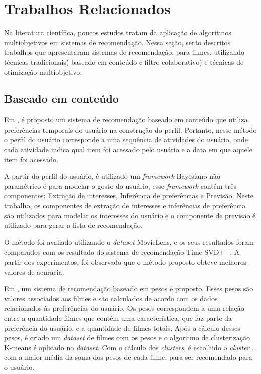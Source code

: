 \section{Trabalhos Relacionados}
Na literatura científica, poucos estudos tratam da aplicação de algoritmos multiobjetivos em sistemas de recomendação. Nessa seção, serão descritos trabalhos que apresentaram sistemas de recomendação, para filmes, utilizando técnicas tradicionais( baseado em conteúdo e filtro colaborativo) e técnicas de otimização multiobjetivo.
\subsection{Baseado em conteúdo}
Em \cite{cami2017content}, é proposto um sistema de recomendação baseado em conteúdo que utiliza preferências temporais do usuário na construção  do perfil. Portanto, nesse método o perfil do usuário corresponde a uma sequência de atividades do usuário, onde cada atividade indica qual item foi acessado pelo usuário e a data em que aquele item foi acessado.
	
A partir do perfil do usuário, é utilizado um \textit{framework} Bayesiano não paramétrico é para modelar o gosto do usuário, esse \textit{framework} contém três componentes: Extração de interesses, Inferência de preferências e Previsão. Neste trabalho, os componentes de extração de interesses e inferências de preferência são utilizados para modelar os interesses do usuário e o componente de previsão é utilizado para gerar a lista de recomendação. 

O método foi avaliado utilizando o \textit{dataset} MovieLens, e os seus resultados foram comparados  com os resultado do sistema de recomendação Time-SVD++. A partir dos experimentos, foi observado que o método proposto obteve melhores valores de acurácia.

Em \cite{himel2017weight}, um sistema de recomendação baseado em pesos é proposto. Esses pesos são valores associados aos filmes e são calculados de acordo com os dados relacionados às preferências do usuário.  Os pesos correspondem a uma relação entre a quantidade filmes que contêm uma característica, que faz parte da preferência do usuário, e a quantidade de filmes totais. Após o cálculo desses pesos,  é criado um \textit{dataset} de filmes com os pesos e o algoritmo de clusterização K-means é aplicado no \textit{dataset}.  Com o cálculo dos \textit{clusters}, é escolhido o \textit{cluster} , com a maior média da soma dos pesos de cada filme, para ser recomendado para o usuário.

